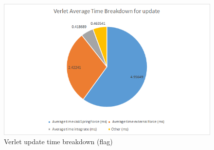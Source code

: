     \begin{figure}
    \begin{center}
      \includegraphics[scale=.9]{Figures/flag_v_ut}
    \end{center}
    \caption{Verlet update time breakdown (flag)}
    \label{fig:v ut flag}
  \end{figure}

